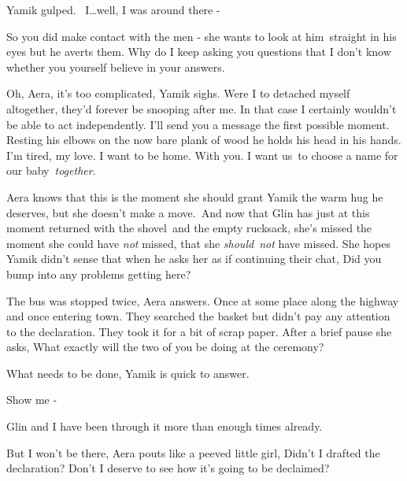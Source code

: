 \documentclass[letterpaper]{article}
\begin{document}
Yamik gulped. {\textquotedbl}\ I{\dots}well, I was around there {}-{\textquotedbl}

{\textquotedbl}So you did make contact with the men -{\textquotedbl} she wants to look at
him\textcolor[rgb]{0.0,0.4392157,0.7529412}{\ }straight in his eyes but he averts them. {\textquotedbl}Why do I keep
asking you questions that I don't know whether you yourself believe in your answers.{\textquotedbl} 

{\textquotedbl}Oh, Aera, it's too complicated,{\textquotedbl} Yamik sighs. {\textquotedbl}Were I to detached myself
altogether, they'd forever be snooping after me. In that case I certainly wouldn't be able to act independently. I'll
send you a message the first possible moment.{\textquotedbl} Resting his elbows on the now bare plank of wood he holds
his head in his hands. {\textquotedbl}I'm tired, my love. I want to be home. With you. I want
us\textcolor[rgb]{0.0,0.4392157,0.7529412}{\ }to choose a name for our baby\ \textit{together}.{\textquotedbl} 

Aera knows that this is the moment she should grant Yamik the warm hug he deserves, but she doesn't make a move.\ And
now that Glin has just at this moment returned with the shovel\ and the empty rucksack, she's missed the moment she
could have \textit{not} missed, that she \textit{should}\ \textit{not} have missed. She hopes Yamik didn't sense that
when he asks her as if continuing their chat, {\textquotedbl}Did you bump into any problems getting
here?{\textquotedbl} 

{\textquotedbl}The bus was stopped twice,{\textquotedbl} Aera answers. {\textquotedbl}Once at some place along the
highway and once entering town. They searched the basket but didn't pay any attention to the declaration. They took it
for a bit of scrap paper.{\textquotedbl} After a brief pause she asks, {\textquotedbl}What exactly will the two of you
be doing at the ceremony?{\textquotedbl} 

{\textquotedbl}What needs to be done,{\textquotedbl} Yamik is quick to answer. 

{\textquotedbl}Show me -{\textquotedbl} 

{\textquotedbl}Glin and I have been through it more than enough times already.{\textquotedbl} 

{\textquotedbl}But I won't be there,{\textquotedbl} Aera pouts like a peeved little girl, {\textquotedbl}Didn't I
drafted the declaration? Don't I deserve to see how it's going to be declaimed?{\textquotedbl} 
\end{document}

